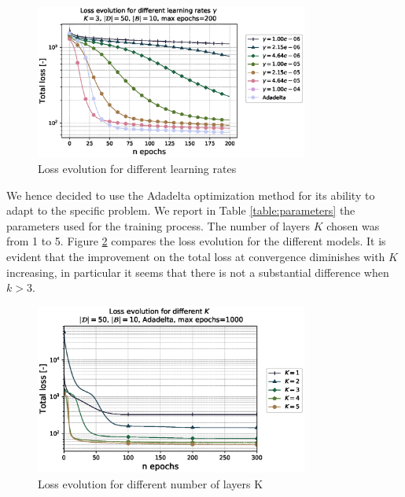 \documentclass{rescience} %
\begin{document}


\begin{figure}[h]
\centering
\includegraphics[width=0.8\textwidth]{figs/hyper.eps}
\caption{Loss evolution for different learning rates}
\label{fig:hyperparam_learning_rate}
\end{figure}    

We hence decided to use the Adadelta optimization method for its ability to adapt to the specific problem. 
We report in Table \ref{table:parameters} the parameters used for the training process. The number of layers $K$ chosen was from 1 to 5. Figure \ref{fig:hyperparam_K} compares the loss evolution for the different models. It is evident that the improvement on the total loss at convergence diminishes with $K$ increasing, in particular it seems that there is not a substantial difference when $k>3$. 

\begin{figure}[h]
\centering
\includegraphics[width=0.8\textwidth]{figs/comparison_K.eps}
\caption{Loss evolution for different number of layers K}
\label{fig:hyperparam_K}
\end{figure}
\end{document}
